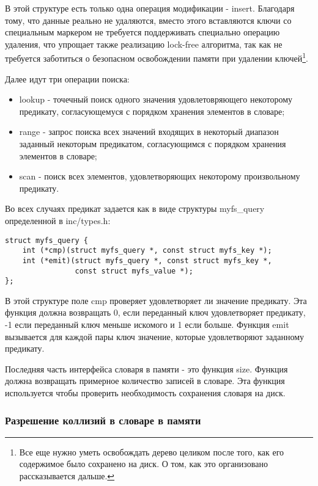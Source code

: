 В этой структуре есть только одна операция модификации - insert. Благодаря тому,
что данные реально не удаляются, вместо этого вставляются ключи со специальным
маркером не требуется поддерживать специально операцию удаления, что упрощает
также реализацию lock-free алгоритма, так как не требуется заботиться о
безопасном освобождении памяти при удалении ключей\footnote{Все еще нужно уметь
освобождать дерево целиком после того, как его содержимое было сохранено на
диск. О том, как это организовано рассказывается дальше.}.

Далее идут три операции поиска:
\begin{itemize}
    \item lookup - точечный поиск одного значения удовлетовряющего некоторому
          предикату, согласующемуся с порядком хранения элементов в словаре;
    \item range - запрос поиска всех значений входящих в некоторый диапазон
          заданный некоторым предикатом, согласующимся с порядком хранения
          элементов в словаре;
    \item scan - поиск всех элементов, удовлетворяющих некоторому произвольному
          предикату.
\end{itemize}

Во всех случаях предикат задается как в виде структуры myfs\_query определенной
в inc/types.h:
\begin{lstlisting}
struct myfs_query {
    int (*cmp)(struct myfs_query *, const struct myfs_key *);
    int (*emit)(struct myfs_query *, const struct myfs_key *,
                const struct myfs_value *);
};
\end{lstlisting}

В этой структуре поле cmp проверяет удовлетворяет ли значение предикату. Эта
функция должна возвращать 0, если переданный ключ удовлетворяет предикату, -1
если переданный ключ меньше искомого и 1 если больше. Функция emit вызывается
для каждой пары ключ значение, которые удовлетворяют заданному предикату.

Последняя часть интерфейса словаря в памяти - это функция size. Функция должна
возвращать примерное количество записей в словаре. Эта функция используется
чтобы проверить необходимость сохранения словаря на диск.


\subsubsection{Разрешение коллизий в словаре в памяти}

